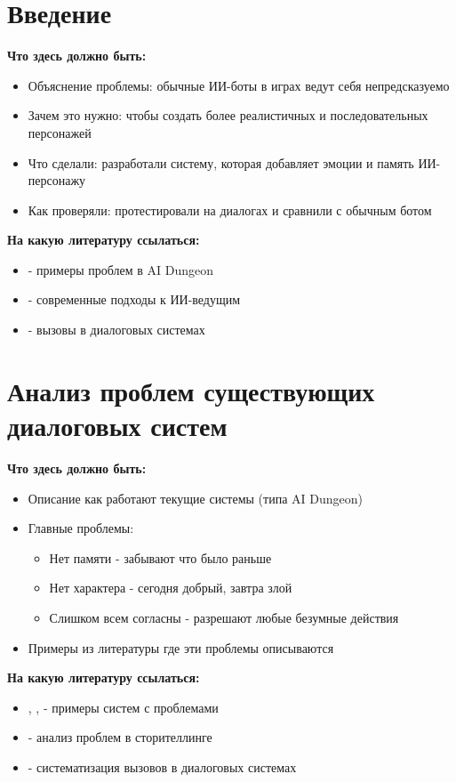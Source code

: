 \documentclass[a4paper,14pt]{extarticle}
\begin{document}
\tableofcontents
\newpage

\section*{Введение}

\textbf{Что здесь должно быть:}
\begin{itemize}
\item Объяснение проблемы: обычные ИИ-боты в играх ведут себя непредсказуемо
\item Зачем это нужно: чтобы создать более реалистичных и последовательных персонажей
\item Что сделали: разработали систему, которая добавляет эмоции и память ИИ-персонажу
\item Как проверяли: протестировали на диалогах и сравнили с обычным ботом
\end{itemize}

\textbf{На какую литературу ссылаться:}
\begin{itemize}
\item \cite{1} - примеры проблем в AI Dungeon
\item \cite{6} - современные подходы к ИИ-ведущим
\item \cite{9} - вызовы в диалоговых системах
\end{itemize}

\section{Анализ проблем существующих диалоговых систем}

\textbf{Что здесь должно быть:}
\begin{itemize}
\item Описание как работают текущие системы (типа AI Dungeon)
\item Главные проблемы:
  \begin{itemize}
  \item Нет памяти - забывают что было раньше
  \item Нет характера - сегодня добрый, завтра злой
  \item Слишком всем согласны - разрешают любые безумные действия
  \end{itemize}
\item Примеры из литературы где эти проблемы описываются
\end{itemize}

\textbf{На какую литературу ссылаться:}
\begin{itemize}
\item \cite{1}, \cite{2}, \cite{3} - примеры систем с проблемами
\item \cite{8} - анализ проблем в сторителлинге
\item \cite{9} - систематизация вызовов в диалоговых системах
\end{itemize}
\end{document}
